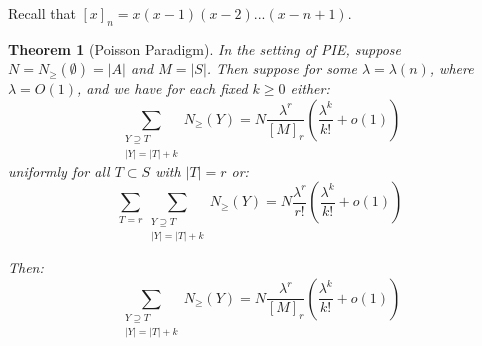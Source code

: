 \documentclass[]{article}
\newtheorem{theorem}{Theorem}
\theoremstyle{definition}
\numberwithin{theorem}{section}
\numberwithin{equation}{section}
\begin{document}
Recall that $[x]_n = x( x - 1) (x - 2) ... (x - n + 1)$. 
\begin{theorem}[Poisson Paradigm]
	In the setting of PIE, suppose $N = N_\geq(\emptyset) = |A|$ and $M = |S|$. Then suppose for some $\lambda = \lambda(n)$, where $\lambda = O(1)$, and we have for each fixed $k \geq 0$ either:
	\begin{equation}
		\sum_{\substack{Y \supseteq T\\ |Y| = |T| + k}} N_{\geq}(Y) = N \frac{\lambda^r}{[M]_r} \left(\frac{\lambda^k}{k!} + o(1)\right)
	\end{equation}
	uniformly for all $T \subset S$ with $|T| = r$ or:
	\begin{equation}
		\sum_{T = r} \sum_{\substack{Y \supseteq T\\ |Y| = |T| + k}} N_{\geq}(Y) = N \frac{\lambda^r}{r!} \left(\frac{\lambda^k}{k!} + o(1)\right)
	\end{equation}
	
	Then:
\begin{equation}
	\sum_{\substack{Y \supseteq T\\ |Y| = |T| + k}} N_{\geq}(Y) = N \frac{\lambda^r}{[M]_r} \left(\frac{\lambda^k}{k!} + o(1)\right)
\end{equation}
\end{theorem}
\end{document}
